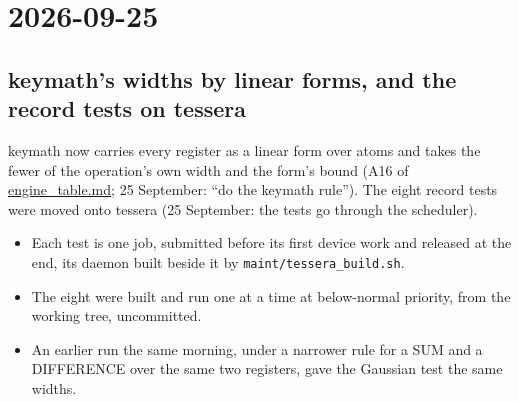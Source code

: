 \section{\texorpdfstring{2026-09-25}{2026-09-25}}

\subsection{\texorpdfstring{keymath's widths by linear forms, and the record tests on tessera}{keymath's widths by linear forms, and the record tests on tessera}}

keymath now carries every register as a linear form over atoms and takes the fewer of the operation's own width and the form's bound (A16 of \hyperref[chap:engine-table]{engine\_\allowbreak{}table.md}; 25 September: “do the keymath rule”). The eight record tests were moved onto tessera (25 September: the tests go through the scheduler).

\begin{itemize}
\item Each test is one job, submitted before its first device work and released at the end, its daemon built beside it by \texttt{maint/\allowbreak{}tessera\_\allowbreak{}build.\allowbreak{}sh}.
\item The eight were built and run one at a time at below-normal priority, from the working tree, uncommitted.
\item An earlier run the same morning, under a narrower rule for a SUM and a DIFFERENCE over the same two registers, gave the Gaussian test the same widths.
\end{itemize}

